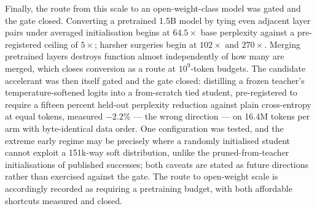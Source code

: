 Finally, the route from this scale to an open-weight-class model was gated and
the gate closed. Converting a pretrained 1.5B model by tying even adjacent layer
pairs under averaged initialisation begins at $64.5\times$ base perplexity
against a pre-registered ceiling of $5\times$; harsher surgeries begin at
$102\times$ and $270\times$. Merging pretrained layers destroys function almost
independently of how many are merged, which closes conversion as a route at
$10^{9}$-token budgets. The candidate accelerant was then itself gated and the
gate closed: distilling a frozen teacher's temperature-softened logits into a
from-scratch tied student, pre-registered to require a fifteen percent held-out
perplexity reduction against plain cross-entropy at equal tokens, measured
$-2.2\%$ --- the wrong direction --- on 16.4M tokens per arm with byte-identical
data order. One configuration was tested, and the extreme early regime may be
precisely where a randomly initialised student cannot exploit a 151k-way soft
distribution, unlike the pruned-from-teacher initialisations of published
successes; both caveats are stated as future directions rather than exercised
against the gate. The route to open-weight scale is accordingly recorded as
requiring a pretraining budget, with both affordable shortcuts measured and
closed.
